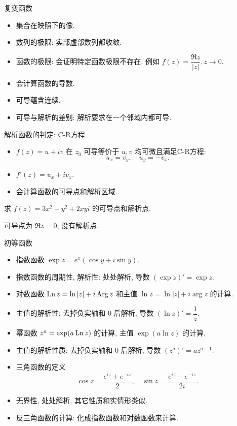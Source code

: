 \documentclass[12pt,handout]{ctexbeamer}
\begin{document}
\begin{frame}{复变函数}
\begin{itemize}
\item 集合在映照下的像.
\item 数列的极限: 实部虚部数列都收敛.
\item 函数的极限: 会证明特定函数极限不存在, 例如 $f(z)=\dfrac{\Re z}{|z|}, z\to 0$.
\item 会计算函数的导数.
\item 可导蕴含连续.
\item 可导与解析的差别: 解析要求在一个邻域内都可导.
\end{itemize}
\end{frame}


\begin{frame}{解析函数的判定: C-R方程}
\begin{itemize}
\item $f(z)=u+iv$ 在 $z_0$ 可导等价于 $u,v$ 均可微且满足C-R方程:
\[u_x=v_y,\quad u_y=-v_x.\]
\item $f'(z)=u_x+iv_x$.
\item 会计算函数的可导点和解析区域.
\end{itemize}

\begin{exercise}
求 $f(z)=3x^2-y^2+2xyi$ 的可导点和解析点.
\end{exercise}
\begin{answer}
可导点为 $\Re z=0$, 没有解析点.
\end{answer}
\end{frame}


\begin{frame}{初等函数}
\begin{itemize}
\item 指数函数 $\exp z=e^x(\cos y+i\sin y)$.
\item 指数函数的周期性, 解析性: 处处解析, 导数 $(\exp z)'=\exp z$.
\item 对数函数 $\operatorname{Ln} z=\ln|z|+i\operatorname{Arg} z$ 和主值 $\ln z=\ln|z|+i\arg z$ 的计算.
\item 主值的解析性: 去掉负实轴和 $0$ 后解析, 导数 $(\ln z)'=\dfrac1z$.
\item 幂函数 $z^a=\exp(a\operatorname{Ln} z)$ 的计算, 主值 $\exp(a\ln z)$ 的计算.
\item 主值的解析性质: 去掉负实轴和 $0$ 后解析, 导数 $(z^a)'=az^{a-1}$.
\item 三角函数的定义
\[\cos z=\frac{e^{iz}+e^{-iz}}2,\quad
\sin z=\frac{e^{iz}-e^{-iz}}{2i}.\]
\item 无界性, 处处解析, 其它性质和实情形类似.
\item 反三角函数的计算: 化成指数函数和对数函数来计算.
\end{itemize}
\end{frame}
\end{document}
